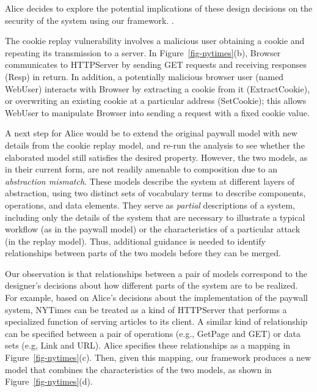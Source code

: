 Alice decides to explore the potential implications of these design
decisions on the security of the system using our framework. .

The cookie replay vulnerability involves a malicious user obtaining a
cookie and repeating its transmission to a server.  In
Figure~\ref{fig-nytimes}(b), \textsf{Browser} communicates to
\textsf{HTTPServer} by sending \textsf{GET} requests and receiving
responses (\textsf{Resp}) in return. In addition, a potentially
malicious browser user (named \textsf{WebUser}) interacts with
\textsf{Browser} by extracting a cookie from it
(\textsf{ExtractCookie}), or overwriting an existing cookie at a
particular address (\textsf{SetCookie}); this allows \textsf{WebUser}
to manipulate \textsf{Browser} into sending a request with a fixed
cookie value.

A next step for Alice would be to extend the original paywall model
with new details from the cookie replay model, and re-run the analysis
to see whether the elaborated model still satisfies the desired
property. However, the two models, as in their current form, are not
readily amenable to composition due to an \textit{abstraction
  mismatch}. These models describe the system at different layers of
abstraction, using two distinct sets of vocabulary terms to describe
components, operations, and data elements. They serve as \textit{partial}
descriptions of a system, including only the details of the system
that are necessary to illustrate a typical workflow (as in the paywall
model) or the characteristics of a particular attack (in the replay
model). Thus, additional guidance is needed to identify relationships
between parts of the two models before they can be merged.

Our observation is that relationships between a pair of models
correspond to the designer's decisions about how different parts of
the system are to be realized. For example, based on Alice's decisions
about the implementation of the paywall system, \textsf{NYTimes} can
be treated as a kind of \textsf{HTTPServer} that performs a
specialized function of serving articles to its client. A similar kind
of relationship can be specified between a pair of operations (e.g.,
\textsf{GetPage} and \textsf{GET}) or data sets (e.g, \textsf{Link}
and \textsf{URL}). Alice specifies these relationships as a mapping in
Figure~\ref{fig-nytimes}(c). Then, given this mapping, our framework
produces a new model that combines the characteristics of the two
models, as shown in Figure~\ref{fig-nytimes}(d).

